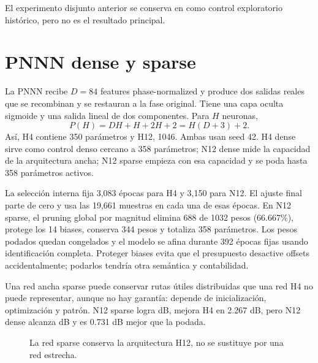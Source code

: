 \documentclass[10pt,a4paper]{article}
\makeatletter
\newcommand{\Rval}[3]{%
  \edef\ResultValue{\csname R@#1@#2\endcsname}%
  \pgfmathprintnumber[fixed,precision=#3]{\ResultValue}}
\makeatother
\begin{document}
El experimento disjunto anterior se conserva en
 como control exploratorio
histórico, pero no es el resultado principal.

\section{PNNN dense y sparse}

La PNNN recibe $D=84$ features phase-normalized y produce dos salidas reales que
se recombinan y se restauran a la fase original. Tiene una capa oculta sigmoide y una
salida lineal de dos componentes. Para $H$ neuronas,
\begin{equation}
 P(H)=DH+H+2H+2=H(D+3)+2.
\end{equation}
Así, H4 contiene 350 parámetros y H12, 1046. Ambas usan seed 42. H4 dense sirve
como control denso cercano a 358 parámetros; N12 dense mide la capacidad de la
arquitectura ancha; N12 sparse empieza con esa capacidad y se poda hasta 358
parámetros activos.

La selección interna fija 3,083 épocas para H4 y 3,150 para N12. El ajuste final
parte de cero y usa las 19,661 muestras en cada una de esas épocas. En N12
sparse, el pruning global por magnitud elimina 688 de 1032 pesos (66.667\%),
protege los 14 biases, conserva 344 pesos y totaliza 358 parámetros. Los pesos
podados quedan congelados y el modelo se afina durante 392 épocas fijas usando
identificación completa. Proteger biases evita que el presupuesto desactive
offsets accidentalmente; podarlos tendría otra semántica y contabilidad.

Una red ancha sparse puede conservar rutas útiles distribuidas que una red H4 no
puede representar, aunque no hay garantía: depende de inicialización,
optimización y patrón. N12 sparse logra \Rval{8}{FullSignalNMSEdB}{3} dB, mejora H4 en
2.267 dB, pero N12 dense alcanza \Rval{7}{FullSignalNMSEdB}{3} dB y es 0.731 dB mejor
que la podada.

\begin{figure}[ht]
\centering
{}
\caption{La red sparse conserva la arquitectura H12, no se sustituye por una red estrecha.}
\label{fig:pruning}
\end{figure}
\end{document}
